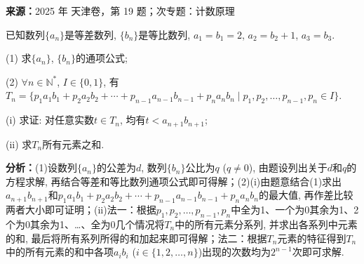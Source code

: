 \begin{question}[points=15]
\textbf{来源：}2025 年 天津卷，第 19 题；次专题：计数原理\par
已知数列$\{a_n\}$是等差数列, $\{b_n\}$是等比数列, $a_1 = b_1 = 2$, $a_2 = b_2 + 1$, $a_3 = b_3$.

(1) 求$\{a_n\}$, $\{b_n\}$的通项公式;

(2) $\forall n \in \mathbb{N}^*$, $I \in \{0,1\}$, 有$T_n = \{p_1 a_1 b_1 + p_2 a_2 b_2 + \cdots + p_{n-1} a_{n-1} b_{n-1} + p_n a_n b_n \mid p_1, p_2, \ldots, p_{n-1}, p_n \in I\}$.

(i) 求证: 对任意实数$t \in T_n$, 均有$t < a_{n+1} b_{n+1}$;

(ii) 求$T_n$所有元素之和.
\begin{solution}

\textbf{分析：}(1)设数列$\{a_n\}$的公差为$d$, 数列$\{b_n\}$公比为$q$ ($q \neq 0$), 由题设列出关于$d$和$q$的方程求解, 再结合等差和等比数列通项公式即可得解；(2)(i)由题意结合(1)求出$a_{n+1}b_{n+1}$和$p_1 a_1 b_1 + p_2 a_2 b_2 + \cdots + p_{n-1} a_{n-1} b_{n-1} + p_n a_n b_n$的最大值, 再作差比较两者大小即可证明；(ii)法一：根据$p_1, p_2, \ldots, p_{n-1}, p_n$中全为1、一个为0其余为1、2个为0其余为1、…、全为0几个情况将$T_n$中的所有元素分系列, 并求出各系列中元素的和, 最后将所有系列所得的和加起来即可得解；法二：根据$T_n$元素的特征得到$T_n$中的所有元素的和中各项$a_i b_i$ ($i \in \{1,2,\ldots,n\}$)出现的次数均为$2^{n-1}$次即可求解.


\end{solution}
\end{question}
